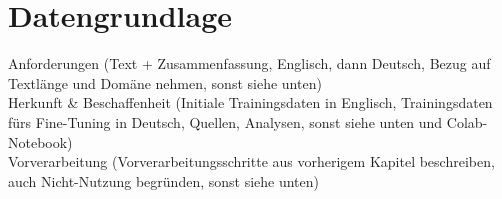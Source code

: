 \chapter{Datengrundlage}
\thispagestyle{fancy}
\label{chap:Datengrundlage}

\noindent
Anforderungen (Text + Zusammenfassung, Englisch, dann Deutsch, Bezug auf Textlänge und Domäne nehmen, sonst siehe unten)\\

\noindent
Herkunft \& Beschaffenheit (Initiale Trainingsdaten in Englisch, Trainingsdaten fürs Fine-Tuning in Deutsch, Quellen, Analysen, sonst siehe unten und Colab-Notebook)\\

\noindent
Vorverarbeitung (Vorverarbeitungsschritte aus vorherigem Kapitel beschreiben, auch Nicht-Nutzung begründen, sonst siehe unten)\\


